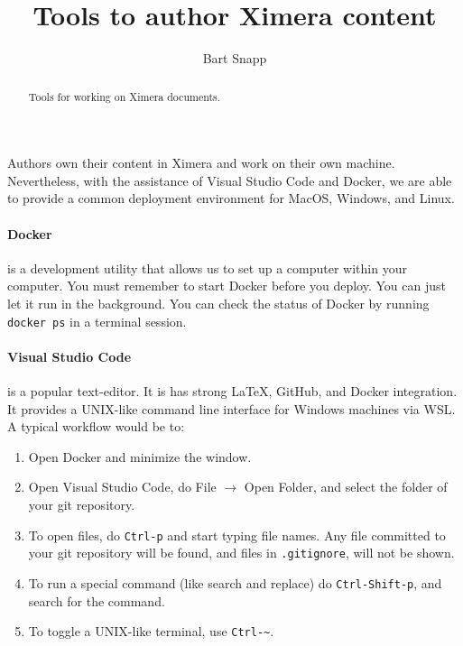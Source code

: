 \documentclass{ximera}
\title{Tools to author Ximera content}
\author{Bart Snapp}
\begin{document}
\begin{abstract}
    Tools for working on Ximera documents.
\end{abstract}
\maketitle

Authors own their content in Ximera and work on their own machine.
Nevertheless, with the assistance of Visual Studio Code and Docker, we are able
to provide a common deployment environment for MacOS, Windows, and Linux.


\paragraph{Docker} is a development utility that allows us to set up a computer
within your
computer. You must remember to start Docker before you deploy. You can just let
it run in the background. You can check the status of Docker by running
\verb!docker ps! in a terminal session.

\paragraph{Visual Studio Code}
is a popular text-editor. It is has strong \LaTeX, GitHub,
and Docker integration. It provides a UNIX-like command line interface for
Windows machines via WSL. A typical workflow would be to:
\begin{enumerate}
    \item Open Docker and minimize the window.
    \item Open Visual Studio Code, do File $\to$ Open Folder, and select the
          folder of your git repository.
    \item To open files, do \verb!Ctrl-p! and start typing file names. Any
          file
          committed to your git repository will be found, and files in
          \verb!.gitignore!, will not be shown.
    \item To run a special command (like search and replace) do
          \verb!Ctrl-Shift-p!, and search for the command.
    \item To toggle a UNIX-like terminal, use \verb!Ctrl-~!.
\end{enumerate}
\end{document}
